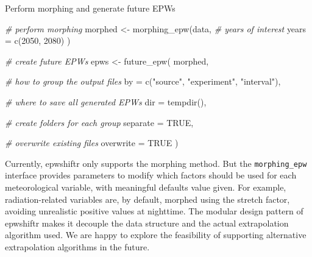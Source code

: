 \documentclass[twocolumn, a4paper,10pt]{article}
\makeatletter
\newenvironment{Code}{\captionsetup{type=code}}{}
\newenvironment{Shaded}{\begin{mdframed}[skipabove=0pt]}{\end{mdframed}}
\newcommand{\AttributeTok}[1]{\textcolor[rgb]{0.77,0.63,0.00}{#1}}
\newcommand{\CommentTok}[1]{\textcolor[rgb]{0.56,0.35,0.01}{\textit{#1}}}
\newcommand{\ConstantTok}[1]{\textcolor[rgb]{0.00,0.00,0.00}{#1}}
\newcommand{\DecValTok}[1]{\textcolor[rgb]{0.00,0.00,0.81}{#1}}
\newcommand{\FunctionTok}[1]{\textcolor[rgb]{0.00,0.00,0.00}{#1}}
\newcommand{\NormalTok}[1]{#1}
\newcommand{\OtherTok}[1]{\textcolor[rgb]{0.56,0.35,0.01}{#1}}
\newcommand{\StringTok}[1]{\textcolor[rgb]{0.31,0.60,0.02}{#1}}
\renewcommand\section{\@startsection{section}{1}{\z@}{3pt}{3pt}{\normalfont\large\bfseries}}
\makeatother
\begin{document}
\begin{Code}
\caption{Perform morphing and generate future EPWs}

\label{lst:epw}

\begin{Shaded}
\begin{Highlighting}[]
\CommentTok{\# perform morphing}
\NormalTok{morphed }\OtherTok{\textless{}{-}} \FunctionTok{morphing\_epw}\NormalTok{(data,}
  \CommentTok{\# years of interest}
  \AttributeTok{years =} \FunctionTok{c}\NormalTok{(}\DecValTok{2050}\NormalTok{, }\DecValTok{2080}\NormalTok{)}
\NormalTok{)}

\CommentTok{\# create future EPWs}
\NormalTok{epws }\OtherTok{\textless{}{-}} \FunctionTok{future\_epw}\NormalTok{(}
\NormalTok{  morphed,}

  \CommentTok{\# how to group the output files}
  \AttributeTok{by =} \FunctionTok{c}\NormalTok{(}\StringTok{"source"}\NormalTok{, }\StringTok{"experiment"}\NormalTok{, }\StringTok{"interval"}\NormalTok{),}

  \CommentTok{\# where to save all generated EPWs}
  \AttributeTok{dir =} \FunctionTok{tempdir}\NormalTok{(),}

  \CommentTok{\# create folders for each group}
  \AttributeTok{separate =} \ConstantTok{TRUE}\NormalTok{,}

  \CommentTok{\# overwrite existing files}
  \AttributeTok{overwrite =} \ConstantTok{TRUE}
\NormalTok{)}
\end{Highlighting}
\end{Shaded}

\end{Code}

Currently, epwshiftr only supports the morphing method. But the \texttt{morphing\_epw}
interface provides parameters to modify which factors should be used for each
meteorological variable, with meaningful defaults value given. For example,
radiation-related variables are, by default, morphed using the stretch factor,
avoiding unrealistic positive values at nighttime. The modular design pattern of
epwshiftr makes it decouple the data structure and the actual extrapolation
algorithm used. We are happy to explore the feasibility of supporting
alternative extrapolation algorithms in the future.

\hypertarget{conclusion}{%
\section{Conclusion}\label{conclusion}}
\end{document}
